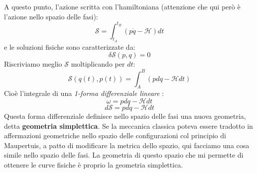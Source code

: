 \documentclass[a4paper,openany]{article}
\begin{document}
	A questo punto, l'azione scritta con l'hamiltoniana (attenzione che qui però è l'azione nello spazio delle fasi):
	$$
	\mathcal{S} = \int_{t_A}^{t_B}(p\dot{q}-\mathcal{H}) dt 
	$$
	e le soluzioni fisiche sono caratterizzate da:
	$$
	\delta \mathcal{S}(p,q) = 0
	$$
	Riscriviamo meglio $\mathcal{S}$ moltiplicando per $dt$:
	\begin{equation}\label{key}
		\mathcal{S}(q(t),p(t)) = \int_{A}^{B}(pdq-\mathcal{H}dt)
	\end{equation}
	Cioè l'integrale di una \textit{1-forma differenziale lineare} :
	$$
	\omega = pdq-\mathcal{H}dt
	$$
	$$
	d\mathcal{S} = pdq -\mathcal{H}dt
	$$
	Questa forma differenziale definisce nello spazio delle fasi una nuova geometria, detta \textbf{geometria simplettica}. Se la meccanica classica poteva essere tradotto in affermazioni geometriche nello spazio delle configurazioni col principio di Maupertuis, a patto di modificare la metrica dello spazio, qui facciamo una cosa simile nello spazio delle fasi. La geometria di questo spazio che mi permette di ottenere le curve fisiche è proprio la geometria simplettica.
\end{document}
